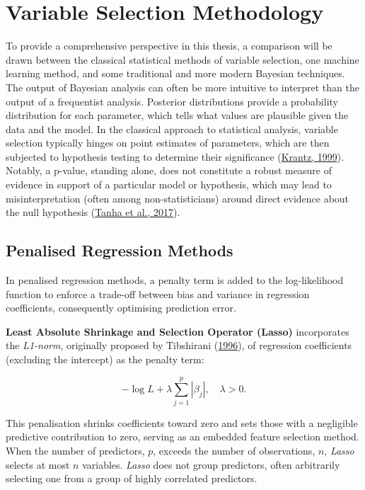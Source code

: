 \documentclass[
  11pt,
]{article}
\begin{document}
\section{Variable Selection Methodology}

To provide a comprehensive perspective in this thesis, a comparison will
be drawn between the classical statistical methods of variable
selection, one machine learning method, and some traditional and more
modern Bayesian techniques. The output of Bayesian analysis can often be
more intuitive to interpret than the output of a frequentist analysis.
Posterior distributions provide a probability distribution for each
parameter, which tells what values are plausible given the data and the
model. In the classical approach to statistical analysis, variable
selection typically hinges on point estimates of parameters, which are
then subjected to hypothesis testing to determine their significance
(\protect\hyperlink{ref-Krantz1999}{Krantz, 1999}). Notably, a p-value,
standing alone, does not constitute a robust measure of evidence in
support of a particular model or hypothesis, which may lead to
misinterpretation (often among non-statisticians) around direct evidence
about the null hypothesis (\protect\hyperlink{ref-Tanha2017}{Tanha et
al., 2017}).

\subsection{Penalised Regression Methods}

In penalised regression methods, a penalty term is added to the
log-likelihood function to enforce a trade-off between bias and variance
in regression coefficients, consequently optimising prediction error.

\textbf{Least Absolute Shrinkage and Selection Operator (Lasso)}
incorporates the \emph{L1-norm}, originally proposed by Tibshirani
(\protect\hyperlink{ref-Tibshirani1996}{1996}), of regression
coefficients (excluding the intercept) as the penalty term:

\begin{equation}
- \log L + \lambda \sum_{j=1}^{p} |\beta_j|, \quad \lambda > 0.
\end{equation}

This penalisation shrinks coefficients toward zero and sets those with a
negligible predictive contribution to zero, serving as an embedded
feature selection method. When the number of predictors, \(p\), exceeds
the number of observations, \(n\), \emph{Lasso} selects at most \(n\)
variables. \emph{Lasso} does not group predictors, often arbitrarily
selecting one from a group of highly correlated predictors.
\end{document}
